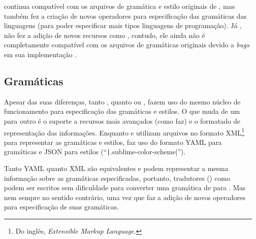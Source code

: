  continua compatível com os arquivos de gramática e
estilo originais de ,
mas também fez a criação de novos operadores para especificação das gramáticas das linguagens (para poder especificar mais tipos linguagens de programação).
Já ,
não fez a adição de novos recursos como ,
contudo,
ele ainda não é completamente compatível com os arquivos de gramáticas originais devido a \textit{bugs} em sua implementação \cite{textMateScopeExclusion}.


\subsection{Gramáticas}
\label{section:sourceCodeHighlightersGrammars}

Apesar das suas diferenças,
tanto , quanto  ou ,
fazem uso do mesmo núcleo de funcionamento para especificação das gramáticas e
estilos.
O que muda de um para outro é o suporte a recursos mais avançados (como  faz) e
o formatado de representação das informações.
Enquanto  e
 utilizam arquivos no formato XML\footnote{
Do inglês,
\textit{Extensible Markup Language}.
} \cite{complexityOfXMLSchema} para representar as gramáticas e
estilos,
 faz uso do formato YAML \cite{yamlSpecificModelChecking} para gramáticas e
JSON para estilos (``\texttt|.sublime-color-scheme|'').

Tanto YAML quanto XML são equivalentes e
podem representar a mesma informação sobre as gramáticas especificadas,
portanto,
tradutores () como  podem ser escritos sem dificuldade para converter uma gramática de  para .
Mas nem sempre no sentido contrário,
uma vez que  faz a adição de novos operadores para especificação de suas gramáticas.

